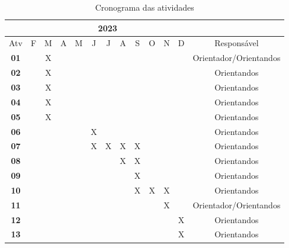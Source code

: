 \begin{table*}[ht]
\centering
\caption{Cronograma das atividades}
\label{tab:cronograma}
\begin{tabular}{|c|c|c|c|c|c|c|c|c|c|c|c|c|}
\hline & \multicolumn{11}{|c|}{2023} & \multicolumn{1}{|c|}{} \\
\hline \multicolumn{1}{|c|}{Atv} & F & M & A & M & J & J & A & S & O & N & D & {Responsável} \\
\hline \textbf{01} & & X& & & & & & & & & & Orientador/Orientandos \\
\hline \textbf{02} & & X& & & & & & & & & & Orientandos \\
\hline \textbf{03} & & X& & & & & & & & & & Orientandos\\
\hline \textbf{04} & & X& & & & & & & & & & Orientandos \\
\hline \textbf{05} & & X& & & & & & & & & & Orientandos \\
\hline \textbf{06} & & & & & X& & & & & & & Orientandos \\
\hline \textbf{07} & & & & & X& X& X& X& & & & Orientandos \\
\hline \textbf{08} & & & & & & & X& X& & & & Orientandos \\
\hline \textbf{09} & & & & & & & & X& & & & Orientandos \\
\hline \textbf{10} & & & & & & & & X& X & X & & Orientandos \\
\hline \textbf{11} & & & & & & & & & & X & & Orientador/Orientandos \\
\hline \textbf{12} & & & & & & & & & & & X & Orientandos \\
\hline \textbf{13} & & & & & & & & & & & X & Orientandos \\
\hline
\end{tabular} 
\end{table*}


